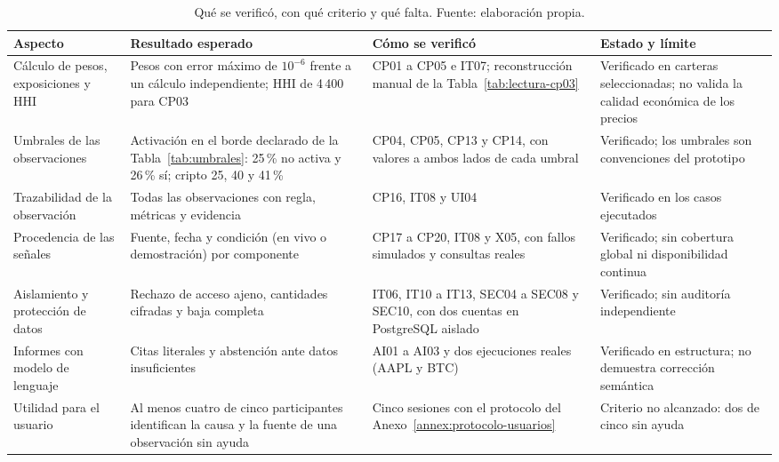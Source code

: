 \begin{table}[ht]
\caption{Qué se verificó, con qué criterio y qué falta. Fuente: elaboración propia.}\label{tab:verificado-criterios}
\centering\footnotesize\renewcommand{\arraystretch}{1.2}
\begin{tabular}{>{\raggedright\arraybackslash}p{2.6cm}>{\raggedright\arraybackslash}p{4.0cm}>{\raggedright\arraybackslash}p{4.4cm}>{\raggedright\arraybackslash}p{3.4cm}}\hline
\textbf{Aspecto} & \textbf{Resultado esperado} & \textbf{Cómo se verificó} & \textbf{Estado y límite}\\\hline
Cálculo de pesos, exposiciones y HHI & Pesos con error máximo de $10^{-6}$ frente a un cálculo independiente; HHI de 4\,400 para CP03 & CP01 a CP05 e IT07; reconstrucción manual de la Tabla~\ref{tab:lectura-cp03} & Verificado en carteras seleccionadas; no valida la calidad económica de los precios\\
Umbrales de las observaciones & Activación en el borde declarado de la Tabla~\ref{tab:umbrales}: 25\,\% no activa y 26\,\% sí; cripto 25, 40 y 41\,\% & CP04, CP05, CP13 y CP14, con valores a ambos lados de cada umbral & Verificado; los umbrales son convenciones del prototipo\\
Trazabilidad de la observación & Todas las observaciones con regla, métricas y evidencia & CP16, IT08 y UI04 & Verificado en los casos ejecutados\\
Procedencia de las señales & Fuente, fecha y condición (en vivo o demostración) por componente & CP17 a CP20, IT08 y X05, con fallos simulados y consultas reales & Verificado; sin cobertura global ni disponibilidad continua\\
Aislamiento y protección de datos & Rechazo de acceso ajeno, cantidades cifradas y baja completa & IT06, IT10 a IT13, SEC04 a SEC08 y SEC10, con dos cuentas en PostgreSQL aislado & Verificado; sin auditoría independiente\\
Informes con modelo de lenguaje & Citas literales y abstención ante datos insuficientes & AI01 a AI03 y dos ejecuciones reales (AAPL y BTC) & Verificado en estructura; no demuestra corrección semántica\\
Utilidad para el usuario & Al menos cuatro de cinco participantes identifican la causa y la fuente de una observación sin ayuda & Cinco sesiones con el protocolo del Anexo~\ref{annex:protocolo-usuarios} & Criterio no alcanzado: dos de cinco sin ayuda\\\hline
\end{tabular}
\end{table}

